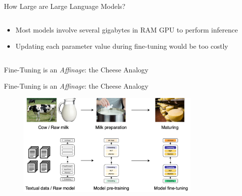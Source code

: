 \documentclass[11pt,aspectratio=169]{beamer}
\begin{document}
\begin{frame}{How Large are Large Language Models?}
\begin{columns}
\begin{column}{0.4\linewidth}
            \vspace{0.5cm}
            \begin{itemize}
                \item <2-> Most models involve several gigabytes in RAM GPU to perform inference
                \item <2-> Updating each parameter value during fine-tuning would be too costly
            \end{itemize}
            \vspace{0.3cm}
        \end{column}
    \end{columns}
    
    
\end{frame}

\begin{frame}{Fine-Tuning is an \textsl{Affinage}: the Cheese Analogy}
\end{frame}

\begin{frame}{Fine-Tuning is an \textsl{Affinage}: the Cheese Analogy}
    \begin{figure}
        \centering
        \includegraphics[width=0.8\textwidth]{pretrain_finetune_2.png}
    \end{figure}
\end{frame}
\end{document}
